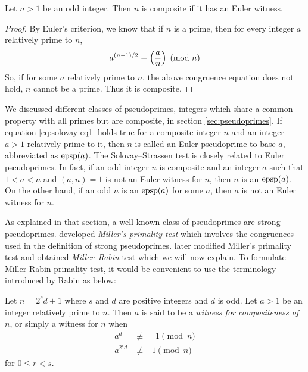 \documentclass{subfiles}
\begin{document}
		\begin{theorem}
			Let $n>1$ be an odd integer. Then $n$ is composite if it has an Euler witness.
		\end{theorem}

		\begin{proof}
			By Euler's criterion, we know that if $n$ is a prime, then for every integer $a$ relatively prime to $n$,
				\begin{align}
					a^{(n-1)/2}  \equiv \func{}{\dfrac{a}{n}} \pmod n \label{eq:solovay-eq1}
				\end{align}
			So, if for some $a$ relatively prime to $n$, the above congruence equation does not hold, $n$ cannot be a prime. Thus it is composite.
		\end{proof}

		\begin{remark}
					We discussed different classes of pseudoprimes, integers which share a common property with all primes but are composite, in section \eqref{sec:pseudoprimes}. If equation \eqref{eq:solovay-eq1} holds true for a composite integer $n$ and an integer $a>1$ relatively prime to it, then $n$ is called an Euler pseudoprime to base $a$, abbreviated as $\operatorname{epsp}(a)$. The Solovay--Strassen test is closely related to Euler pseudoprimes. In fact, if an odd integer $n$ is composite and an integer $a$ such that $1<a<n$ and $(a,n)=1$ is not an Euler witness for $n$, then $n$ is an $\operatorname{epsp}(a)$. On the other hand, if an odd $n$ is an $\operatorname{epsp}(a)$ for some $a$, then $a$ is not an Euler witness for $n$.
		\end{remark}

	 As explained in that section, a well-known class of pseudoprimes are strong pseudoprimes. \textcite{miller_1975} developed \textit{Miller's primality test} which involves the congruences used in the definition of strong pseudoprimes. \textcite{rabin_1980} later modified Miller's primality test and obtained \textit{Miller--Rabin} test which we will now explain. To formulate Miller-Rabin primality test, it would be convenient to use the terminology introduced by Rabin as below:

		\begin{definition}
			Let $n=2^sd+1$ where $s$ and $d$ are positive integers and $d$ is odd. Let $a>1$ be an integer relatively prime to $n$. Then $a$ is said to be a \textit{witness for compositeness of $n$}, or simply a witness for $n$ when
				\begin{align*}
				a^d &\not\equiv \phantom{-} 1 \pmod n\\
				a^{2^rd} &\not\equiv -1 \pmod n
				\end{align*}
			for $0\leq r<s$.
		\end{definition}
\end{document}
